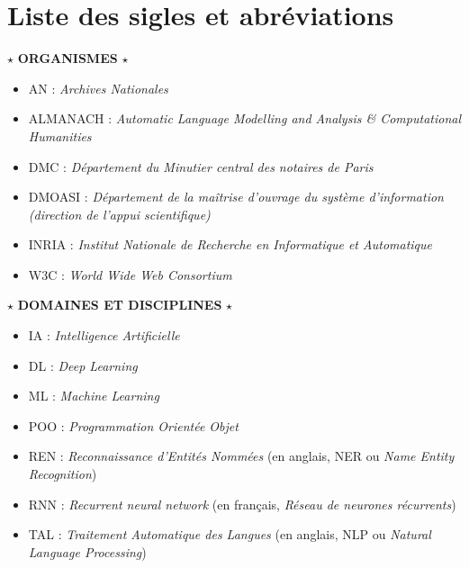 \chapter*{Liste des sigles et abréviations}

\begin{center}
$\star$ \textbf{\textsc{ORGANISMES}} $\star$
\end{center} 
\begin{itemize}
    \item AN : \emph{Archives Nationales}
    \item ALMANACH : \emph{Automatic Language Modelling and Analysis \& Computational Humanities}
    \item DMC : \emph{Département du Minutier central des notaires de Paris}
    \item DMOASI : \emph{Département de la maîtrise d’ouvrage du système d'information (direction de l'appui scientifique)} 
    \item INRIA : \emph{Institut Nationale de Recherche en Informatique et Automatique}
    \item W3C : \emph{\textit{World Wide Web Consortium}}
\end{itemize}

\begin{center}
$\star$ \textbf{\textsc{DOMAINES ET DISCIPLINES}} $\star$
\end{center} 
\begin{itemize}
    \item IA : \emph{Intelligence Artificielle}
    \item DL : \emph{\textit{Deep Learning}}
    \item ML : \emph{\textit{Machine Learning}}
    \item POO : \emph{\textit{Programmation Orientée Objet}}
    \item REN : \emph{Reconnaissance d'Entités Nommées} (en anglais, NER ou \textit{Name Entity Recognition})
    \item RNN : \emph{Recurrent neural network} (en français, \emph{Réseau de neurones récurrents})
    \item TAL : \emph{Traitement Automatique des Langues} (en anglais, NLP ou \textit{Natural Language Processing})
\end{itemize}

